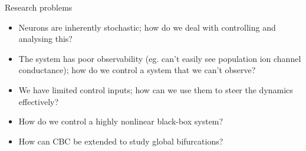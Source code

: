 \documentclass[aspectratio=169]{beamer}
\begin{document}
\begin{frame}[label={sec:org8274cc8}]{Research problems}
\begin{itemize}[<+->]
\item Neurons are inherently stochastic; how do we deal with controlling and analysing this?
\item The system has poor observability (eg. can't easily see population ion channel conductance); how do we control a system that we can't observe?
\item We have limited control inputs; how can we use them to steer the dynamics effectively?
\item How do we control a highly nonlinear black-box system?
\item How can CBC be extended to study global bifurcations?
\end{itemize}
\end{frame}
\end{document}
